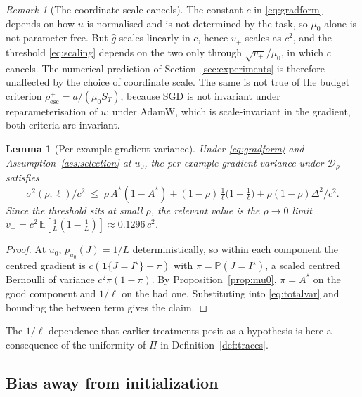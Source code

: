 \documentclass{article}
\theoremstyle{plain}
\newtheorem{lemma}{Lemma}
\theoremstyle{definition}
\theoremstyle{remark}
\newtheorem{remark}{Remark}
\newcommand{\E}{\mathbb{E}}
\newcommand{\Prob}{\mathbb{P}}
\newcommand{\1}{\mathbf{1}}
\newcommand{\cD}{\mathcal{D}}
\begin{document}
\begin{remark}[The coordinate scale cancels]
\label{rem:scale}
The constant $c$ in \eqref{eq:gradform} depends on how $u$ is normalised and is
not determined by the task, so $\mu_0$ alone is not parameter-free. But
$\hat g$ scales linearly in $c$, hence $v_+$ scales as $c^2$, and the threshold
\eqref{eq:scaling} depends on the two only through $\sqrt{v_+}/\mu_0$, in which
$c$ cancels. The numerical prediction of Section~\ref{sec:experiments} is
therefore unaffected by the choice of coordinate scale. The same is not true of
the budget criterion $\rho^{+}_{\mathrm{esc}} = a/(\mu_0S_T)$, because SGD is not
invariant under reparameterisation of $u$; under AdamW, which is scale-invariant
in the gradient, both criteria are invariant.
\end{remark}

\begin{lemma}[Per-example gradient variance]
\label{lem:variance}
Under \eqref{eq:gradform} and Assumption~\ref{ass:selection} at $u_0$, the
per-example gradient variance under $\cD_\rho$ satisfies
\begin{equation}
\label{eq:variance}
\sigma^2(\rho,\ell)/c^2
\;\le\;
\rho\,\bar A^\star(1-\bar A^\star)
+ (1-\rho)\,\tfrac1\ell\big(1-\tfrac1\ell\big)
+ \rho(1-\rho)\Delta^2/c^2 .
\end{equation}
Since the threshold sits at small $\rho$, the relevant value is the $\rho\to0$
limit $v_+ = c^2\,\E[\tfrac1L(1-\tfrac1L)] \approx 0.1296\,c^2$.
\end{lemma}

\begin{proof}
At $u_0$, $p_{u_0}(J) = 1/L$ deterministically, so within each component the
centred gradient is $c(\1\{J=I^\star\}-\pi)$ with $\pi = \Prob(J = I^\star)$, a
scaled centred Bernoulli of variance $c^2\pi(1-\pi)$. By
Proposition~\ref{prop:mu0}, $\pi = \bar A^\star$ on the good component and
$1/\ell$ on the bad one. Substituting into \eqref{eq:totalvar} and bounding the
between term gives the claim.
\end{proof}

The $1/\ell$ dependence that earlier treatments posit as a hypothesis is here a
consequence of the uniformity of $\Pi$ in Definition~\ref{def:traces}.

\subsection{Bias away from initialization}
\label{sec:bias}
\end{document}
